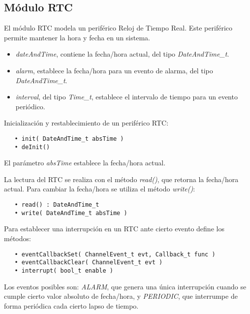 \subsection{Módulo RTC}

El módulo RTC modela un periférico Reloj de Tiempo Real. Este periférico permite mantener la hora y fecha en un sistema.


\begin{itemize}
\item
\emph{dateAndTime}, contiene la fecha/hora actual, del tipo \emph{DateAndTime\_t}.
\item
\emph{alarm}, establece la fecha/hora para un evento de alarma, del tipo \emph{DateAndTime\_t}.
\item
\emph{interval}, del tipo \emph{Time\_t}, establece el intervalo de tiempo para un evento periódico.
\end{itemize}


Inicialización y restablecimiento de un periférico RTC:

\begin{verbatim}
   • init( DateAndTime_t absTime )
   • deInit()
\end{verbatim}

El parámetro \emph{absTime} establece la fecha/hora actual. 

La lectura del RTC se realiza con el método \emph{read()}, que retorna la fecha/hora actual. Para cambiar la fecha/hora se utiliza el método \emph{write()}:

\begin{verbatim}
   • read() : DateAndTime_t
   • write( DateAndTime_t absTime )
\end{verbatim}

Para establecer una interrupción en un RTC ante cierto evento define los métodos: 

\begin{verbatim}
   • eventCallbackSet( ChannelEvent_t evt, Callback_t func )
   • eventCallbackClear( ChannelEvent_t evt )
   • interrupt( bool_t enable )
\end{verbatim}

Los eventos posibles son: \emph{ALARM}, que genera una única interrupción cuando se cumple cierto valor absoluto de fecha/hora, y \emph{PERIODIC}, que interrumpe de forma periódica cada cierto lapso de tiempo.
